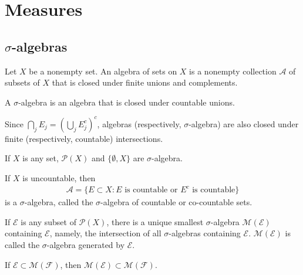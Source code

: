 \setchapterpreamble[u]{\margintoc}
\chapter{Measures}

\section{\texorpdfstring{$\sigma$}{sigma}-algebras}

\begin{definition}[Algebra]
Let $X$ be a nonempty set. 
An algebra of sets on $X$ is a nonempty collection $\mathcal{A}$ of subsets of $X$ that is closed under finite unions and complements.
\end{definition}

\begin{definition}
A $\sigma$-algebra is an algebra that is closed under countable unions.
\end{definition}

Since $\bigcap_{j} E_j = (\bigcup_{j} E_j^c)^c$, algebras (respectively, $\sigma$-algebra) are also closed under finite (respectively, countable) intersections.

\begin{example}
If $X$ is any set, $\mathcal{P}(X)$ and $\{ \emptyset, X \}$ are $\sigma$-algebra.
\end{example}

\begin{example}
If $X$ is uncountable, then 
\begin{align}
\mathcal{A} = \{ E \subset X : E \text{ is countable or } E^{c} \text{ is countable} \}
\end{align}
is a $\sigma$-algebra, called the $\sigma$-algebra of countable or co-countable sets.
\end{example}

\begin{definition}
If $\mathcal{E}$ is any subset of $\mathcal{P}(X)$, there is a unique smallest $\sigma$-algebra $\mathcal{M}(\mathcal{E})$ containing $\mathcal{E}$, namely, the intersection of all $\sigma$-algebras containing $\mathcal{E}$. 
$\mathcal{M}(\mathcal{E})$ is called the $\sigma$-algebra generated by $\mathcal{E}$.
\end{definition}

\begin{lemma}
If $\mathcal{E} \subset \mathcal{M}(\mathcal{F})$, then $\mathcal{M}(\mathcal{E}) \subset \mathcal{M}(\mathcal{F})$.
\end{lemma}

